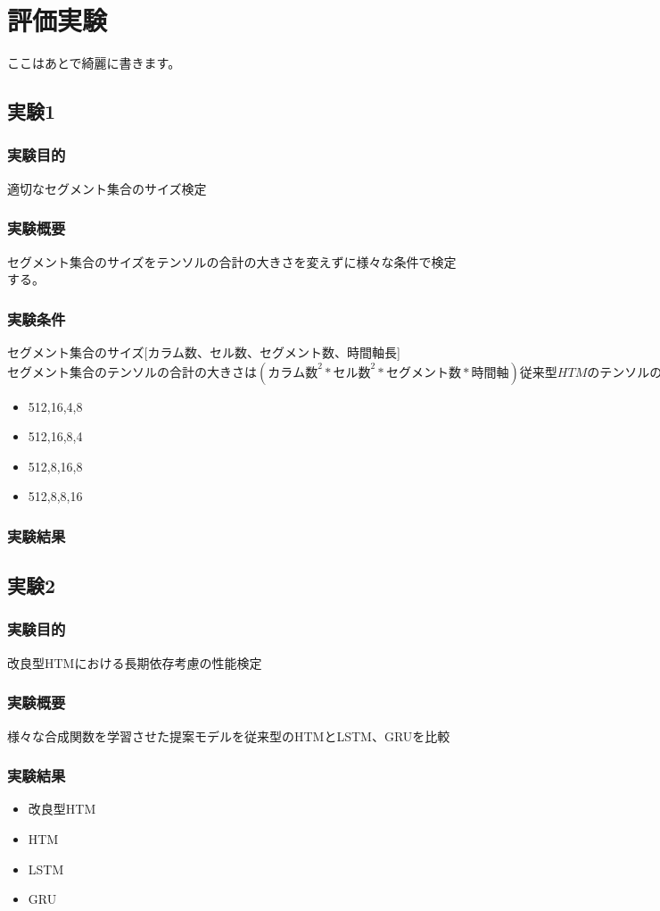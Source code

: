 \chapter{評価実験}
ここはあとで綺麗に書きます。

\section{実験1}
\subsection{実験目的}
適切なセグメント集合のサイズ検定

\subsection{実験概要}
セグメント集合のサイズをテンソルの合計の大きさを変えずに様々な条件で検定する。

\subsection{実験条件}
セグメント集合のサイズ[カラム数、セル数、セグメント数、時間軸長]
$セグメント集合のテンソルの合計の大きさは(カラム数^2*セル数^2*セグメント数*時間軸)
従来型HTMのテンソルの合計サイズ(512,16,32,1)の場合512^2*16^2*32*1=2^31$

\begin{itemize}
  \item 512,16,4,8
  \item 512,16,8,4
  \item 512,8,16,8
  \item 512,8,8,16
\end{itemize}

\subsection{実験結果}

\section{実験2}
\subsection{実験目的}
改良型HTMにおける長期依存考慮の性能検定

\subsection{実験概要}
様々な合成関数を学習させた提案モデルを従来型のHTMとLSTM、GRUを比較

\subsection{実験結果}

\begin{itemize}
  \item 改良型HTM
  \item HTM
  \item LSTM
  \item GRU
\end{itemize}
